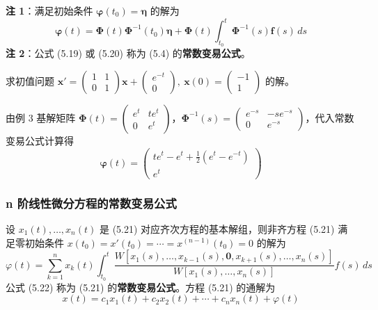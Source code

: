 \begin{remark}
\textbf{注 1}：满足初始条件 $\boldsymbol{\varphi}(t_0) = \boldsymbol{\eta}$ 的解为
\begin{equation}\boldsymbol{\varphi}(t) = \boldsymbol{\Phi}(t)\boldsymbol{\Phi}^{-1}(t_0)\boldsymbol{\eta} + \boldsymbol{\Phi}(t)\int_{t_0}^{t}\boldsymbol{\Phi}^{-1}(s)\mathbf{f}(s)\,ds \tag{5.20}\end{equation}
\textbf{注 2}：公式 (5.19) 或 (5.20) 称为 (5.4) 的\textbf{常数变易公式}。
\end{remark}

\begin{example}
求初值问题 $\mathbf{x}' = \begin{pmatrix} 1 & 1 \\ 0 & 1 \end{pmatrix}\mathbf{x} + \begin{pmatrix} e^{-t} \\ 0 \end{pmatrix}, \ \mathbf{x}(0) = \begin{pmatrix} -1 \\ 1 \end{pmatrix}$ 的解。
\end{example}

\begin{solution}
由例 3 基解矩阵 $\boldsymbol{\Phi}(t) = \begin{pmatrix} e^t & te^t \\ 0 & e^t \end{pmatrix}$，$\boldsymbol{\Phi}^{-1}(s) = \begin{pmatrix} e^{-s} & -se^{-s} \\ 0 & e^{-s} \end{pmatrix}$，代入常数变易公式计算得
$$\boldsymbol{\varphi}(t) = \begin{pmatrix} te^t - e^t + \frac{1}{2}(e^t - e^{-t}) \\ e^t \end{pmatrix}$$
\end{solution}

\subsubsection{n 阶线性微分方程的常数变易公式}

设 $x_1(t), \ldots, x_n(t)$ 是 (5.21) 对应齐次方程的基本解组，则非齐方程 (5.21) 满足零初始条件 $x(t_0) = x'(t_0) = \cdots = x^{(n-1)}(t_0) = 0$ 的解为
\begin{equation}\varphi(t) = \sum_{k=1}^{n} x_k(t)\int_{t_0}^{t} \frac{W[x_1(s), \ldots, x_{k-1}(s), \mathbf{0}, x_{k+1}(s), \ldots, x_n(s)]}{W[x_1(s), \ldots, x_n(s)]} f(s)\,ds \tag{5.22}\end{equation}
公式 (5.22) 称为 (5.21) 的\textbf{常数变易公式}。方程 (5.21) 的通解为
$$x(t) = c_1x_1(t) + c_2x_2(t) + \cdots + c_nx_n(t) + \varphi(t)$$

